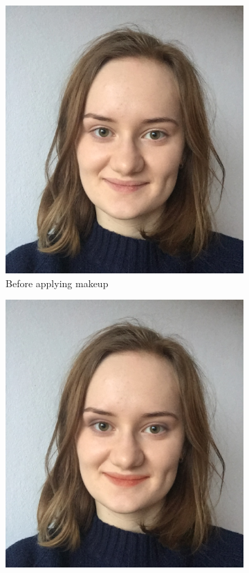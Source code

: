 \documentclass[conference]{IEEEtran}
\begin{document}
\begin{figure}
    \centering
    \begin{subfigure}{0.49\linewidth}
        \centering \includegraphics[height=9\baselineskip]{before.png}
        \caption{Before applying makeup}
    \end{subfigure}
    \hfill
    \begin{subfigure}{0.49\linewidth}
        \centering \includegraphics[height=9\baselineskip]{after.png}

\end{subfigure}
\end{figure}
\end{document}
